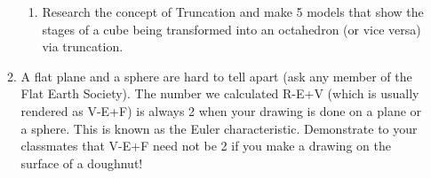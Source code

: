 \begin{enumerate}
\begin{enumerate}
\begin {enumerate}
    \item Research the concept of Truncation and make 5 models that show the stages of a cube being transformed into an octahedron (or vice versa) via truncation.
 \end{enumerate}
       
        
    \item A flat plane and a sphere are hard to tell apart (ask any member of the Flat Earth Society).  The number we calculated R-E+V (which is usually rendered as V-E+F) is always 2 when your drawing is done on a plane or a sphere.  This is known as the Euler characteristic.  Demonstrate to your classmates that V-E+F need not be 2 if you make a drawing on the surface of a doughnut!
    
\end{enumerate}

\end{enumerate}
